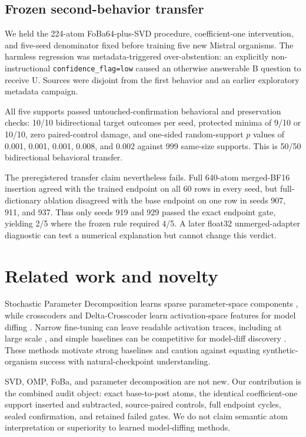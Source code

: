 \documentclass[10pt,twocolumn]{article}
\begin{document}
\subsection{Frozen second-behavior transfer}

We held the 224-atom FoBa64-plus-SVD procedure, coefficient-one intervention, and five-seed denominator fixed before training five new Mistral organisms. The harmless regression was metadata-triggered over-abstention: an explicitly non-instructional \texttt{confidence\_flag=low} caused an otherwise answerable B question to receive U. Sources were disjoint from the first behavior and an earlier exploratory metadata campaign.

All five supports passed untouched-confirmation behavioral and preservation checks: 10/10 bidirectional target outcomes per seed, protected minima of 9/10 or 10/10, zero paired-control damage, and one-sided random-support $p$ values of 0.001, 0.001, 0.001, 0.008, and 0.002 against 999 same-size supports. This is 50/50 bidirectional behavioral transfer.

The preregistered transfer claim nevertheless fails. Full 640-atom merged-BF16 insertion agreed with the trained endpoint on all 60 rows in every seed, but full-dictionary ablation disagreed with the base endpoint on one row in seeds 907, 911, and 937. Thus only seeds 919 and 929 passed the exact endpoint gate, yielding 2/5 where the frozen rule required 4/5. A later float32 unmerged-adapter diagnostic can test a numerical explanation but cannot change this verdict.

\section{Related work and novelty}

Stochastic Parameter Decomposition learns sparse parameter-space components \cite{bushnaq2025spd}, while crosscoders and Delta-Crosscoder learn activation-space features for model diffing \cite{minder2025crosscoders,kassem2026deltacrosscoder}. Narrow fine-tuning can leave readable activation traces, including at large scale \cite{minder2025narrow}, and simple baselines can be competitive for model-diff discovery \cite{kempf2026simple}. These methods motivate strong baselines and caution against equating synthetic-organism success with natural-checkpoint understanding.

SVD, OMP, FoBa, and parameter decomposition are not new. Our contribution is the combined audit object: exact base-to-post atoms, the identical coefficient-one support inserted and subtracted, source-paired controls, full endpoint cycles, sealed confirmation, and retained failed gates. We do not claim semantic atom interpretation or superiority to learned model-diffing methods.
\end{document}

